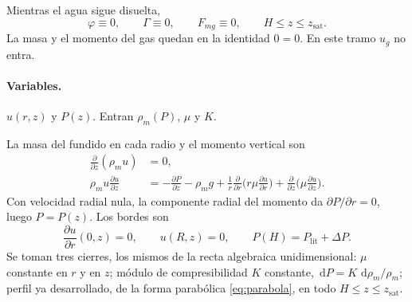 \documentclass[11pt,a4paper]{article}
\newcommand{\dd}{\,\mathrm{d}}
\newcommand{\p}{\partial}
\begin{document}
Mientras el agua sigue disuelta,
\begin{equation}
\label{eq:sinbub}
\varphi\equiv 0,\qquad \Gamma\equiv 0,\qquad F_{mg}\equiv 0,
\qquad H\le z\le z_{\mathrm{sat}}.
\end{equation}
La masa y el momento del gas quedan en la identidad $0=0$. En este
tramo $u_g$ no entra.

\paragraph{Variables.}
$u(r,z)$ y $P(z)$. Entran $\rho_m(P)$, $\mu$ y $K$.

La masa del fundido en cada radio y el momento vertical son
\begin{align}
\label{eq:masa-sb}
\frac{\p}{\p z}(\rho_m u)&=0,
\\
\label{eq:mom-sb}
\rho_m u\frac{\p u}{\p z}
&=-\frac{\p P}{\p z}-\rho_m g
+\frac{1}{r}\frac{\p}{\p r}\Biggl(r\mu\frac{\p u}{\p r}\Biggr)
+\frac{\p}{\p z}\Biggl(\mu\frac{\p u}{\p z}\Biggr).
\end{align}
Con velocidad radial nula, la componente radial del momento da
$\p P/\p r=0$, luego $P=P(z)$. Los bordes son
\begin{equation}
\label{eq:bc-sb}
\frac{\p u}{\p r}(0,z)=0,
\qquad
u(R,z)=0,
\qquad
P(H)=P_{\mathrm{lit}}+\Delta P.
\end{equation}
Se toman tres cierres, los mismos de la recta algebraica
unidimensional: $\mu$ constante en $r$ y en $z$; módulo de
compresibilidad $K$ constante, $\dd P=K\,\dd\rho_m/\rho_m$; perfil
ya desarrollado, de la forma parabólica \eqref{eq:parabola}, en todo
$H\le z\le z_{\mathrm{sat}}$.
\end{document}
